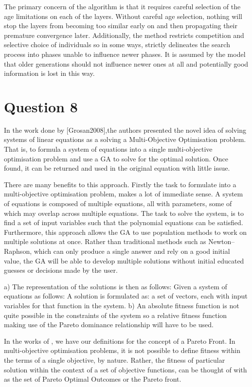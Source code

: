 \documentclass[12pt]{article}
\begin{document}
The primary concern of the algorithm is that it requires careful selection of the age limitations on each of the layers. Without careful age selection, nothing will stop the layers from becoming too similar early on and then propagating their premature convergence later. Additionally, the method restricts competition and selective choice of individuals so in some ways, strictly delineates the search process into phases unable to influence newer phases. It is assumed by the model that older generations should not influence newer ones at all and potentially good information is lost in this way. 
\section{Question 8}
In the work done by [Grosan2008],the authors presented the novel idea of solving systems of linear equations as a solving a Multi-Objective Optimisation problem. That is, to formula a system of equations into a single multi-objective optimisation problem and use a GA to solve for the optimal solution. Once found, it can be returned and used in the original equation with little issue.

 	There are many benefits to this approach. Firstly the task to formulate into a multi-objective optimisation problem, makes a lot of immediate sense. A system of equations is composed of multiple equations, all with parameters, some of which may overlap across multiple equations. The task to solve the system, is to find a set of input variables such that the polynomial equations can be satisfied. 
 	Furthermore, this approach allows the GA to use population methods to work on multiple solutions at once. Rather than traditional methods such as  Newton–Raphson, which can only produce a single answer and rely on a good initial value, the GA will be able to develop multiple solutions without initial educated guesses or decisions made by the user.

	a) The representation of the solutions is then as follows:
	Given a system of equations as follows:
	A solution is formulated as:
	a set of vectors, each with input variables for that function in the system.
	b) An absolute fitness function is not quite possible in the constraints of the system so a relative fitness function making use of the Pareto dominance relationship will have to be used.

	In the works of \cite{nonlinearm2013}, we have our definitions for the concept of a Pareto Front. In multi-objective optimisation problems, it is not possible to define fitness within the terms of a single objective, by nature. Rather, the fitness of particular solution within the context of a set of objective functions, can be thought of with as the set of Pareto Optimal Outcomes or the Pareto front. 
\end{document}
